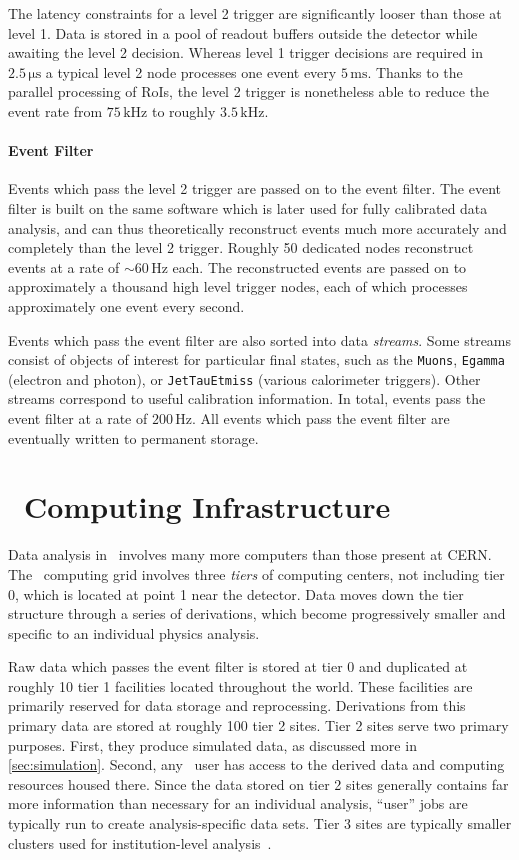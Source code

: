 The latency constraints for a level 2 trigger are significantly looser than those at level 1. Data is stored in a pool of readout buffers outside the detector while awaiting the level 2 decision. Whereas level 1 trigger decisions are required in $2.5\,\mathrm{\mu s}$ a typical level 2 node processes one event every $5\,\mathrm{ms}$.
Thanks to the parallel processing of RoIs, the level 2 trigger is nonetheless able to reduce the event rate from $75\,\mathrm{kHz}$ to roughly $3.5\,\mathrm{kHz}$.

\paragraph{Event Filter}
Events which pass the level 2 trigger are passed on to the event filter.
The event filter is built on the same software which is later used for fully calibrated data analysis, and can thus theoretically reconstruct events much more accurately and completely than the level 2 trigger.
Roughly 50 dedicated nodes reconstruct events at a rate of $\sim 60\,\mathrm{Hz}$ each.
The reconstructed events are passed on to approximately a thousand high level trigger nodes, each of which processes approximately one event every second.

Events which pass the event filter are also sorted into data \emph{streams}.
Some streams consist of objects of interest for particular final states, such as the \texttt{Muons}, \texttt{Egamma} (electron and photon), or \texttt{JetTauEtmiss} (various calorimeter triggers).
Other streams correspond to useful calibration information.
In total, events pass the event filter at a rate of $200\,\mathrm{Hz}$.
All events which pass the event filter are eventually written to permanent storage.

\section{\atlas\ Computing Infrastructure}
Data analysis in \atlas\ involves many more computers than those present at CERN.
The \atlas\ computing grid involves three \emph{tiers} of computing centers, not including tier 0, which is located at point 1 near the detector.
Data moves down the tier structure through a series of derivations, which become progressively smaller and specific to an individual physics analysis.

Raw data which passes the event filter is stored at tier 0 and duplicated at roughly 10 tier 1 facilities located throughout the world.
These facilities are primarily reserved for data storage and reprocessing.
Derivations from this primary data are stored at roughly 100 tier 2 sites.
Tier 2 sites serve two primary purposes.
First, they produce simulated data, as discussed more in \cref{sec:simulation}.
Second, any \atlas\ user has access to the derived data and computing resources housed there.
Since the data stored on tier 2 sites generally contains far more information than necessary for an individual analysis, ``user'' jobs are typically run to create analysis-specific data sets.
Tier 3 sites are typically smaller clusters used for institution-level analysis~\cite{atlas-computing-tdr}.

